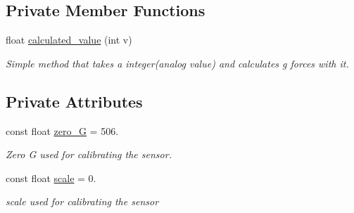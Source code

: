 \subsection*{Private Member Functions}
\begin{DoxyCompactItemize}
\item 
float \hyperlink{classADXL335_a7fb91580937b0aa266ada6598cad1f4d}{calculated\+\_\+value} (int v)
\begin{DoxyCompactList}\small\item\em Simple method that takes a integer(analog value) and calculates g forces with it. \end{DoxyCompactList}\end{DoxyCompactItemize}
\subsection*{Private Attributes}
\begin{DoxyCompactItemize}
\item 
const float \hyperlink{classADXL335_a16f1b26ee0936255e4dc51242f761377}{zero\+\_\+G} = 506.\hypertarget{classADXL335_a16f1b26ee0936255e4dc51242f761377}{}\label{classADXL335_a16f1b26ee0936255e4dc51242f761377}

\begin{DoxyCompactList}\small\item\em Zero G used for calibrating the sensor. \end{DoxyCompactList}\item 
const float \hyperlink{classADXL335_afaa3461d483474f08fb877661306f5ad}{scale} = 0.\hypertarget{classADXL335_afaa3461d483474f08fb877661306f5ad}{}\label{classADXL335_afaa3461d483474f08fb877661306f5ad}

\begin{DoxyCompactList}\small\item\em scale used for calibrating the sensor \end{DoxyCompactList}\end{DoxyCompactItemize}
{\bf }\par

